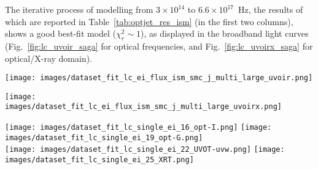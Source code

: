\documentclass{aa}
\begin{document}
The iterative process of modelling from $3 \times 10^{14}$ to $6.6 \times 10^{17}$~Hz, the results of which are reported in Table~\ref{tab:optjet_res_ism} (in the first two columns), shows a good best-fit model ($\chi^2_r \sim 1$), as displayed in the broadband light curves (Fig.~\ref{fig:lc_uvoir_saga} for optical frequencies, and Fig.~\ref{fig:lc_uvoirx_saga} for optical/X-ray domain).
%
\begin{figure*} %
\centering
{\texttt{[image: images/dataset\_fit\_lc\_ei\_flux\_ism\_smc\_j\_multi\_large\_uvoir.png]}}
\caption{Broadband modelling (UVOIR frequencies; Table~\ref{tab:optjet_res_ism}, first column) of GRB\,160131A for a FS model with a ISM-like CBM (GS02); we considered in this analysis a jetted (edge-regime) emission with dust extinction and energy injection.
Filled circles indicate detections, and downward triangles indicate $3\sigma$ upper limits.}
\label{fig:lc_uvoir_saga}
\end{figure*}
%
\begin{figure*} %
\centering
{\texttt{[image: images/dataset\_fit\_lc\_ei\_flux\_ism\_smc\_j\_multi\_large\_uvoirx.png]}}
\caption{Broadband modelling (from optical to X-ray frequencies; Table~\ref{tab:optjet_res_ism}, second column) of GRB\,160131A.
See the caption of Fig.~\ref{fig:lc_uvoir_saga} for a full description of the modelling.
Filled circles indicate detections, and downward triangles indicate $3\sigma$ upper limits.}
\label{fig:lc_uvoirx_saga}
\end{figure*}
%
\begin{figure*} %
\centering
{\texttt{[image: images/dataset\_fit\_lc\_single\_ei\_16\_opt-I.png]}} \quad
{\texttt{[image: images/dataset\_fit\_lc\_single\_ei\_19\_opt-G.png]}} \\
{\texttt{[image: images/dataset\_fit\_lc\_single\_ei\_22\_UVOT-uvw.png]}} \quad
{\texttt{[image: images/dataset\_fit\_lc\_single\_ei\_25\_XRT.png]}} \\
\caption{Light curves of GRB\,160131A in the UVOIR/X-rays domain at i'-filter ($4.03 \times 10^{14}$, top left), g'-filter ($6.47 \times 10^{14}$, top right), UV/uvw1-filter ($1.15 \times 10^{15}$, bottom left), and X-ray frequency ($6.65 \times 10^{17}$, bottom right), referred to the broadband modelling from optical to X-ray frequencies (Table~\ref{tab:optjet_res_ism}, second column), displayed in Fig.~\ref{fig:lc_uvoirx_saga}.
The bottom panel of each light curve corresponds to the residuals of the fit.
See the caption of Fig.~\ref{fig:lc_uvoir_saga} for a full description of the modelling.
Filled circles indicate detections, upside down triangles indicate $3\sigma$ upper limits, and green lines show the resulting model.}
\label{fig:zoom_saga_uvoirx}
\end{figure*}
\end{document}
